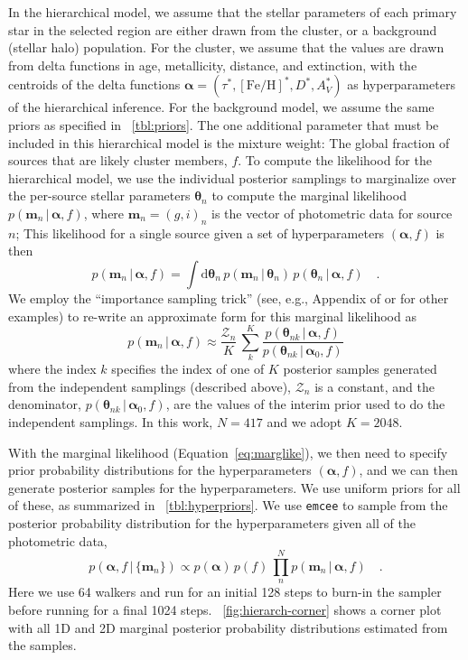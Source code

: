 \documentclass[twocolumn]{aastex62}
\newcommand{\bs}[1]{\boldsymbol{#1}}
\newcommand{\equationname}{Equation}
\newcommand{\given}{\,|\,}
\newcommand{\dd}{\mathrm{d}}
\newcommand{\feh}{\ensuremath{[\textrm{Fe} / \textrm{H}]}}
\newcommand{\Nisofit}{417}
\begin{document}
In the hierarchical model, we assume that the stellar parameters of each primary star in the selected region are either drawn from the cluster, or a background (stellar halo) population.
For the cluster, we assume that the values are drawn from delta functions in age, metallicity, distance, and extinction, with the centroids of the delta functions $\bs{\alpha} = (\tau^*, \feh^*, D^*, A_V^*)$ as hyperparameters of the hierarchical inference.
For the background model, we assume the same priors as specified in \tablename~\ref{tbl:priors}.
The one additional parameter that must be included in this hierarchical model is the mixture weight: The global fraction of sources that are likely cluster members, $f$.
To compute the likelihood for the hierarchical model, we use the individual posterior samplings to marginalize over the per-source stellar parameters $\bs{\theta}_n$ to compute the marginal likelihood $p(\bs{m}_n \given \bs{\alpha}, f)$, where $\bs{m}_n = (g, i)_n$ is the vector of photometric data for source $n$;
This likelihood for a single source given a set of hyperparameters $(\bs{\alpha}, f)$ is then
\begin{equation}
    p(\bs{m}_n \given \bs{\alpha}, f) = \int \dd \bs{\theta}_n \,
        p(\bs{m}_n \given \bs{\theta}_n) \,
        p(\bs{\theta}_n \given \bs{\alpha}, f) \quad .
\end{equation}
We employ the ``importance sampling trick'' (see, e.g., Appendix of \citealt{Price-Whelan:2018} or \citealt{Hogg:2010, Foreman-Mackey:2014} for other examples) to re-write an approximate form for this marginal likelihood as
\begin{equation}
    p(\bs{m}_n \given \bs{\alpha}, f) \approx \frac{\mathcal{Z}_n}{K} \,
        \sum_k^K \frac{p(\bs{\theta}_{nk} \given \bs{\alpha}, f)}{p(\bs{\theta}_{nk} \given \bs{\alpha}_0, f)}
        \label{eq:marglike}
\end{equation}
where the index $k$ specifies the index of one of $K$ posterior samples generated from the independent samplings (described above), $\mathcal{Z}_n$ is a constant, and the denominator, $p(\bs{\theta}_{nk} \given \bs{\alpha}_0, f)$, are the values of the interim prior used to do the independent samplings.
In this work, $N=\Nisofit$ and we adopt $K=2048$.

With the marginal likelihood (\equationname~\ref{eq:marglike}), we then need to specify prior probability distributions for the hyperparameters $(\bs{\alpha}, f)$, and we can then generate posterior samples for the hyperparameters.
We use uniform priors for all of these, as summarized in \tablename~\ref{tbl:hyperpriors}.
We use \texttt{emcee} \citep{emcee, Goodman:2010} to sample from the posterior probability distribution for the hyperparameters given all of the photometric data,
\begin{equation}
    p(\bs{\alpha}, f \given \{\bs{m}_n\}) \propto
        p(\bs{\alpha}) \, p(f) \,
        \prod_n^N p(\bs{m}_n \given \bs{\alpha}, f) \quad.
\end{equation}
Here we use 64 walkers and run for an initial 128 steps to burn-in the sampler before running for a final 1024 steps.
\figurename~\ref{fig:hierarch-corner} shows a corner plot with all 1D and 2D marginal posterior probability distributions estimated from the samples.
\end{document}
